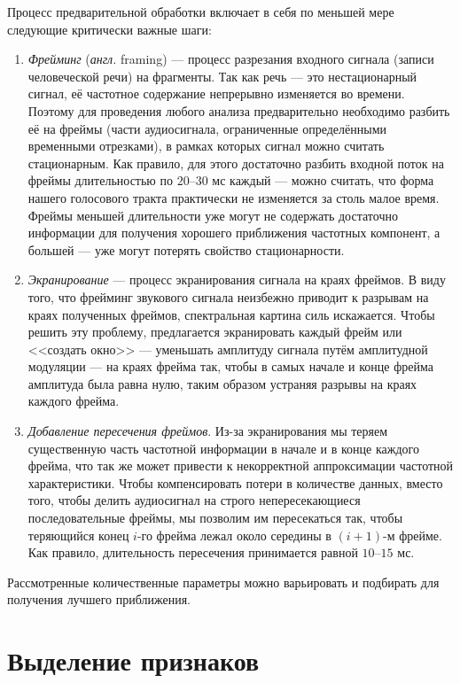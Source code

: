 \documentclass[12pt]{gost-7-32}
\begin{document}
Процесс предварительной обработки включает в себя по меньшей мере \cite{jin_noise_mfcc} следующие критически важные шаги:
\begin{enumerate}
    \item \textit{Фрейминг} (\textit{англ.} framing) --- процесс разрезания входного сигнала (записи человеческой речи) на фрагменты.
        Так как речь --- это нестационарный сигнал, её частотное содержание непрерывно изменяется во времени.
        Поэтому для проведения любого анализа предварительно необходимо разбить её на фреймы (части аудиосигнала, ограниченные определёнными временными отрезками), в рамках которых сигнал можно считать стационарным.
        Как правило, для этого достаточно разбить входной поток на фреймы длительностью по $20$--$30$ мс каждый --- можно считать, что форма нашего голосового тракта практически не изменяется за столь малое время.
        Фреймы меньшей длительности уже могут не содержать достаточно информации для получения хорошего приближения частотных компонент, а большей --- уже могут потерять свойство стационарности.
    \item \textit{Экранирование} --- процесс экранирования сигнала на краях фреймов.
        В виду того, что фрейминг звукового сигнала неизбежно приводит к разрывам на краях полученных фреймов, спектральная картина силь искажается.
        Чтобы решить эту проблему, предлагается экранировать каждый фрейм или <<создать окно>> --- уменьшать амплитуду сигнала путём амплитудной модуляции --- на краях фрейма так, чтобы в самых начале и конце фрейма амплитуда была равна нулю, таким образом устраняя разрывы на краях каждого фрейма.
    \item \textit{Добавление пересечения фреймов}.
        Из-за экранирования мы теряем существенную часть частотной информации в начале и в конце каждого фрейма, что так же может привести к некорректной аппроксимации частотной характеристики.
        Чтобы компенсировать потери в количестве данных, вместо того, чтобы делить аудиосигнал на строго непересекающиеся последовательные фреймы, мы позволим им пересекаться так, чтобы теряющийся конец $i$-го фрейма лежал около середины в $(i+1)$-м фрейме.
        Как правило, длительность пересечения принимается равной $10$--$15$ мс.
\end{enumerate}

Рассмотренные количественные параметры можно варьировать и подбирать для получения лучшего приближения.

\section{Выделение признаков}
\end{document}
